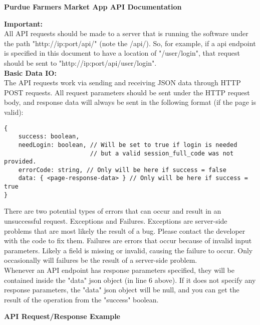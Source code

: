 \documentclass{article}[11pt]
\begin{document}
\vspace{.1in}

\centerline{\textbf{Purdue Farmers Market App API Documentation}} \bigskip

\textbf{Important: } \\ All API requests should be made to a server that is running the software under the path "http://ip:port/api/" (note the /api/). So, for example, if a api endpoint is specified in this document to have a location of "/user/login", that request should be sent to "http://ip:port/api/user/login". \\

\textbf{Basic Data IO:} \\
The API requests work via sending and receiving JSON data through HTTP POST requests. All request parameters should be sent under the HTTP request body, and response data will always be sent in the following format (if the page is valid):

\begin{verbatim}
{
    success: boolean,
    needLogin: boolean, // Will be set to true if login is needed
                        // but a valid session_full_code was not provided.
    errorCode: string, // Only will be here if success = false
    data: { <page-response-data> } // Only will be here if success = true
}
\end{verbatim}

There are two potential types of errors that can occur and result in an unsuccessful request. Exceptions and Failures. Exceptions are server-side problems that are most likely the result of a bug. Please contact the developer with the code to fix them. Failures are errors that occur because of invalid input parameters. Likely a field is missing or invalid, causing the failure to occur. Only occasionally will failures be the result of a server-side problem. \\

Whenever an API endpoint has response parameters specified, they will be contained inside the "data" json object (in line 6 above). If it does not specify any response parameters, the "data" json object will be null, and you can get the result of the operation from the "success" boolean. \\

\newpage

\textbf{API Request/Response Example} \\
\end{document}
